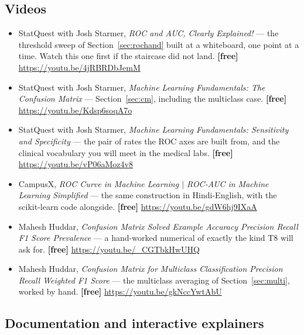\documentclass[11pt]{article}
\begin{document}
\subsection*{Videos}

\begin{itemize}[leftmargin=*]
  \item StatQuest with Josh Starmer, \emph{ROC and AUC, Clearly Explained!} ---
    the threshold sweep of Section~\ref{sec:rochand} built at a whiteboard, one
    point at a time. Watch this one first if the staircase did not land.
    \textbf{[free]} \url{https://youtu.be/4jRBRDbJemM}
  \item StatQuest with Josh Starmer, \emph{Machine Learning Fundamentals: The
    Confusion Matrix} --- Section~\ref{sec:cm}, including the multiclass case.
    \textbf{[free]} \url{https://youtu.be/Kdsp6soqA7o}
  \item StatQuest with Josh Starmer, \emph{Machine Learning Fundamentals:
    Sensitivity and Specificity} --- the pair of rates the ROC axes are built
    from, and the clinical vocabulary you will meet in the medical labs.
    \textbf{[free]} \url{https://youtu.be/vP06aMoz4v8}
  \item CampusX, \emph{ROC Curve in Machine Learning $\vert$ ROC-AUC in Machine
    Learning Simplified} --- the same construction in Hindi-English, with the
    scikit-learn code alongside. \textbf{[free]}
    \url{https://youtu.be/gdW6hj9IXaA}
  \item Mahesh Huddar, \emph{Confusion Matrix Solved Example Accuracy Precision
    Recall F1 Score Prevalence} --- a hand-worked numerical of exactly the kind
    T8 will ask for. \textbf{[free]} \url{https://youtu.be/_CGTbkHwUHQ}
  \item Mahesh Huddar, \emph{Confusion Matrix for Multiclass Classification
    Precision Recall Weighted F1 Score} --- the multiclass averaging of
    Section~\ref{sec:multi}, worked by hand. \textbf{[free]}
    \url{https://youtu.be/gkNccYwtAbU}
\end{itemize}

\subsection*{Documentation and interactive explainers}
\end{document}
